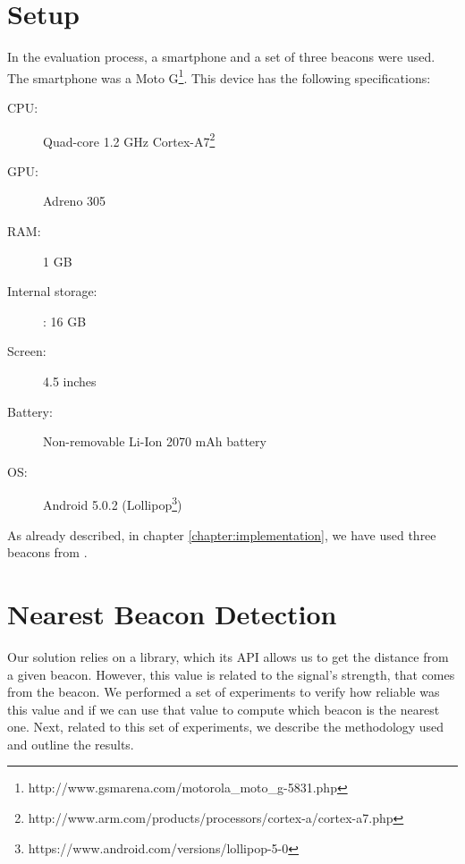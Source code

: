 \section{Setup}
\label{sec:evaluation_setup}
In the evaluation process, a smartphone and a set of three beacons were used.
The smartphone was a 
Moto G\footnote{http://www.gsmarena.com/motorola\_moto\_g-5831.php}.
This device has the following specifications:
\begin{description}
  \item[\gls{CPU}:] Quad-core 1.2 GHz Cortex-A7\footnote{http://www.arm.com/products/processors/cortex-a/cortex-a7.php}
  \item[\gls{GPU}:] Adreno 305
  \item[\gls{RAM}:] 1 \gls{GB}
  \item[Internal storage:]: 16 \gls{GB}
  \item[Screen:] 4.5 inches
  \item[Battery:] Non-removable Li-Ion 2070 \gls{mAh} battery
  \item[\gls{OS}:] Android 5.0.2 (Lollipop\footnote{https://www.android.com/versions/lollipop-5-0})
\end{description}

As already described, in chapter \ref{chapter:implementation}, we have used three beacons from .

\section{Nearest Beacon Detection}
\label{sec:evaluation_nearest_beacon}
Our solution relies on a library, which its \gls{API} allows us to get the distance from a given beacon.
However, this value is related to the signal's strength, that comes from the beacon.
We performed a set of experiments to verify how reliable was this value and if we can use that value to compute which beacon is the nearest one.
Next, related to this set of experiments, we describe the methodology used and outline the results.


